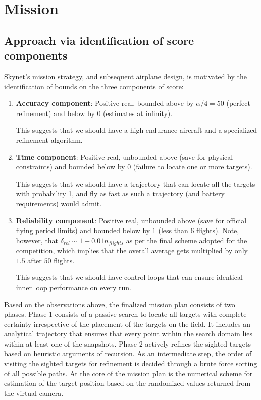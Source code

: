 \section{Mission}
\label{Mission}

\subsection{Approach via identification of score components}
Skynet's mission strategy, and subsequent airplane design, is motivated by the identification of bounds on the three components of score:

\begin{enumerate}
\item \textbf{Accuracy component}: Positive real, bounded above by $\alpha/4 = 50$ (perfect refinement) and below by $0$ (estimates at infinity). 

This suggests that we should have a high endurance aircraft and a specialized refinement algorithm.

\item \textbf{Time component}: Positive real, unbounded above (save for physical constraints) and bounded below by $0$ (failure to locate one or more targets).

This suggests that we should have a trajectory that can locate all the targets with probability 1, and fly as fast as such a trajectory (and battery requirements) would admit.

\item \textbf{Reliability component}: Positive real, unbounded above (save for official flying period limits) and bounded below by $1$ (less than 6 flights). Note, however, that $\delta_{rel} \sim 1 + 0.01 n_{flights}$ as per the final scheme adopted for the competition, which implies that the overall average gets multiplied by only $1.5$ after $50$ flights. 

This suggests that we should have control loops that can ensure identical inner loop performance on every run.

\end{enumerate}

Based on the observations above, the finalized mission plan consists of two phases. Phase-1 consists of a passive search to locate all targets with complete certainty irrespective of the placement of the targets on the field. It includes an analytical trajectory that ensures that every point within the search domain lies within at least one of the snapshots. Phase-2 actively refines the sighted targets based on heuristic arguments of recursion. As an intermediate step, the order of visiting the sighted targets for refinement is decided through a brute force sorting of all possible paths.
At the core of the mission plan is the numerical scheme for estimation of the target position based on the randomized values returned from the virtual camera. 

